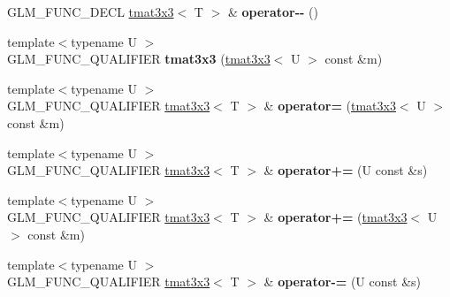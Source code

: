 \begin{DoxyCompactItemize}
\item 
\hypertarget{structglm_1_1detail_1_1tmat3x3_a85bb0e7a7e92c25903e544f0bc2b0578}{}G\+L\+M\+\_\+\+F\+U\+N\+C\+\_\+\+D\+E\+C\+L \hyperlink{structglm_1_1detail_1_1tmat3x3}{tmat3x3}$<$ T $>$ \& {\bfseries operator-\/-\/} ()\label{structglm_1_1detail_1_1tmat3x3_a85bb0e7a7e92c25903e544f0bc2b0578}

\item 
\hypertarget{structglm_1_1detail_1_1tmat3x3_ab691d7caf9061561191dd850583f5378}{}{\footnotesize template$<$typename U $>$ }\\G\+L\+M\+\_\+\+F\+U\+N\+C\+\_\+\+Q\+U\+A\+L\+I\+F\+I\+E\+R {\bfseries tmat3x3} (\hyperlink{structglm_1_1detail_1_1tmat3x3}{tmat3x3}$<$ U $>$ const \&m)\label{structglm_1_1detail_1_1tmat3x3_ab691d7caf9061561191dd850583f5378}

\item 
\hypertarget{structglm_1_1detail_1_1tmat3x3_aa6cc9ed7b043e1a0e875d53fae70b9cc}{}{\footnotesize template$<$typename U $>$ }\\G\+L\+M\+\_\+\+F\+U\+N\+C\+\_\+\+Q\+U\+A\+L\+I\+F\+I\+E\+R \hyperlink{structglm_1_1detail_1_1tmat3x3}{tmat3x3}$<$ T $>$ \& {\bfseries operator=} (\hyperlink{structglm_1_1detail_1_1tmat3x3}{tmat3x3}$<$ U $>$ const \&m)\label{structglm_1_1detail_1_1tmat3x3_aa6cc9ed7b043e1a0e875d53fae70b9cc}

\item 
\hypertarget{structglm_1_1detail_1_1tmat3x3_a6d63393cb6bfbbb178ea94c3f8e32a33}{}{\footnotesize template$<$typename U $>$ }\\G\+L\+M\+\_\+\+F\+U\+N\+C\+\_\+\+Q\+U\+A\+L\+I\+F\+I\+E\+R \hyperlink{structglm_1_1detail_1_1tmat3x3}{tmat3x3}$<$ T $>$ \& {\bfseries operator+=} (U const \&s)\label{structglm_1_1detail_1_1tmat3x3_a6d63393cb6bfbbb178ea94c3f8e32a33}

\item 
\hypertarget{structglm_1_1detail_1_1tmat3x3_a6a6a2f95ee79fb5d44be2302528f621d}{}{\footnotesize template$<$typename U $>$ }\\G\+L\+M\+\_\+\+F\+U\+N\+C\+\_\+\+Q\+U\+A\+L\+I\+F\+I\+E\+R \hyperlink{structglm_1_1detail_1_1tmat3x3}{tmat3x3}$<$ T $>$ \& {\bfseries operator+=} (\hyperlink{structglm_1_1detail_1_1tmat3x3}{tmat3x3}$<$ U $>$ const \&m)\label{structglm_1_1detail_1_1tmat3x3_a6a6a2f95ee79fb5d44be2302528f621d}

\item 
\hypertarget{structglm_1_1detail_1_1tmat3x3_a0eb0cfb073fa68a4d59d23c4ed753306}{}{\footnotesize template$<$typename U $>$ }\\G\+L\+M\+\_\+\+F\+U\+N\+C\+\_\+\+Q\+U\+A\+L\+I\+F\+I\+E\+R \hyperlink{structglm_1_1detail_1_1tmat3x3}{tmat3x3}$<$ T $>$ \& {\bfseries operator-\/=} (U const \&s)\label{structglm_1_1detail_1_1tmat3x3_a0eb0cfb073fa68a4d59d23c4ed753306}


\end{DoxyCompactItemize}
